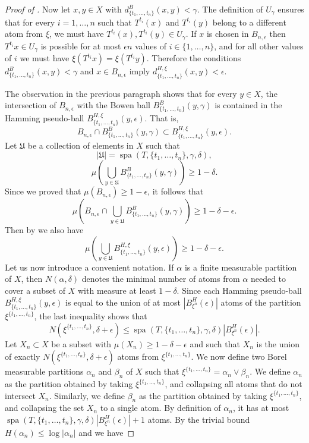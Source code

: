 \documentclass[a4paper,oneside]{amsart}
\renewcommand{\(}{\begin{dmath*}}
\renewcommand{\)}{\end{dmath*}}
\theoremstyle{definition}
\newcommand{\spa}{\operatorname{spa}}
\begin{document}
\begin{proof}[Proof of ]
    Now let  $x,y \in X$ with $d^B_{\{t_1,\dots,t_n\}}(x,y)<\gamma$. The definition of $U_\gamma$ ensures that for every $i=1,\dots,n$ such that $T^{t_i}(x)$ and $T^{t_i}(y)$ belong to a different atom from $\xi$, we must have $T^{t_i}(x),T^{t_i}(y)\in U_\gamma$.  If $x$ is chosen in $B_{n,\epsilon}$ then $T^{t_i}x\in U_\gamma$ is possible for at most $\epsilon n$ values of  $i\in\{1,\dots,n\}$, and for all other values of $i$ we must have $\xi(T^{t_i} x)=\xi(T^{t_i}y)$. Therefore the conditions $d^B_{\{t_1,\dots,t_n\}}(x,y)<\gamma$ and $x\in B_{n,\epsilon}$ imply $d^{H,\xi}_{\{t_1,\dots,t_n\}}(x,y)<\epsilon$.

    The observation in the previous paragraph shows that for every $y\in X$,  the intersection of $B_{n,\epsilon}$ with the Bowen ball 
    $B^B_{\{t_1,\dots,t_n\}}(y,\gamma)$
    is contained in the Hamming pseudo-ball $B^{H,\xi}_{\{t_1,\dots,t_n\}}(y,\epsilon)$. That is,
    \begin{equation}\label{bowen-contained-in-hamming}
    B_{n,\epsilon}\cap B^B_{\{t_1,\dots,t_n\}}(y,\gamma)\subset B^{H,\xi}_{\{t_1,\dots,t_n\}}(y,\epsilon).\end{equation}
    Let $\mathfrak U$ be a collection of elements in $X$ such that \[|\mathfrak U|=\spa(T,\{t_1,\dots,t_n\},\gamma,\delta),\] 
    \[\mu(\bigcup_{y\in\mathfrak U}B^B_{\{t_1,\dots,t_n\}}(y,\gamma))\geq 1-\delta.\]
    Since we proved that $\mu(B_{n,\epsilon})\geq 1-\epsilon$, it follows that
    \[\mu(B_{n,\epsilon}\cap \bigcup_{y\in\mathfrak U}B^B_{\{t_1,\dots,t_n\}}(y,\gamma))\geq 1-\delta-\epsilon.\]
    Then by  we also have   
    \[\mu(\bigcup_{y\in\mathfrak U}B^{H,\xi}_{\{t_1,\dots,t_n\}}(y,\epsilon))\geq 1-\delta-\epsilon.\]
    Let us now introduce a convenient notation. If $\alpha$ is a finite measurable partition of $X$, then $N(\alpha,\delta)$ denotes the minimal number of atoms from $\alpha$ needed to cover a subset of $X$ with measure at least $1-\delta$. Since each Hamming pseudo-ball $B^{H,\xi}_{\{t_1,\dots,t_n\}}(y,\epsilon)$ is equal to the union of at most $|B^H_{\xi^n}(\epsilon)|$ atoms of the partition $\xi^{\{t_1,\dots,t_n\}}$, the last inequality shows that
    \[N(\xi^{\{t_1,\dots,t_n\}},\delta+\epsilon)\leq\spa(T,\{t_1,\dots,t_n\},\gamma,\delta) |B^H_{\xi^n}(\epsilon)|.\]
    Let $X_n\subset X$ be a subset with $\mu(X_n)\geq 1-\delta-\epsilon$ and such that $X_n$ is the union of exactly $N(\xi^{\{t_1,\dots,t_n\}},\delta+\epsilon)$ atoms from $\xi^{\{t_1,\dots,t_n\}}$. We now define two Borel measurable partitions $\alpha_n$ and $\beta_n$ of $X$ such that $\xi^{\{t_1,\dots,t_n\}}=\alpha_n\vee\beta_n$. We define $\alpha_n$ as the partition obtained by taking  $\xi^{\{t_1,\dots,t_n\}}$, and collapsing all atoms that do not intersect $X_n$. Similarly, we define $\beta_n$  as the partition obtained by taking  $\xi^{\{t_1,\dots,t_n\}}$, and collapsing the set $X_n$ to a single atom.     By definition of $\alpha_n$, it has at most $\spa(T,\{t_1,\dots,t_n\},\gamma,\delta) |B^H_{\xi^n}(\epsilon)|+1$ atoms. By the trivial bound $H(\alpha_n)\leq \log|\alpha_n|$ and  we have 

\end{proof}
\end{document}
